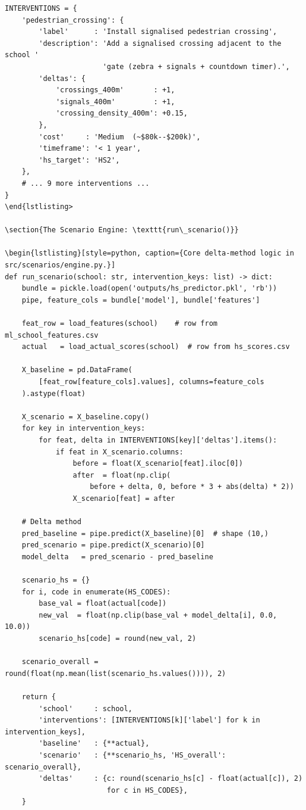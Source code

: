 \documentclass[11pt,a4paper,openany]{book}
\begin{document}
\begin{lstlisting}[style=python, caption={Example intervention definition (pedestrian\_crossing).}]
INTERVENTIONS = {
    'pedestrian_crossing': {
        'label'      : 'Install signalised pedestrian crossing',
        'description': 'Add a signalised crossing adjacent to the school '
                       'gate (zebra + signals + countdown timer).',
        'deltas': {
            'crossings_400m'       : +1,
            'signals_400m'         : +1,
            'crossing_density_400m': +0.15,
        },
        'cost'     : 'Medium  (~$80k--$200k)',
        'timeframe': '< 1 year',
        'hs_target': 'HS2',
    },
    # ... 9 more interventions ...
}
\end{lstlisting>

\section{The Scenario Engine: \texttt{run\_scenario()}}

\begin{lstlisting}[style=python, caption={Core delta-method logic in src/scenarios/engine.py.}]
def run_scenario(school: str, intervention_keys: list) -> dict:
    bundle = pickle.load(open('outputs/hs_predictor.pkl', 'rb'))
    pipe, feature_cols = bundle['model'], bundle['features']

    feat_row = load_features(school)    # row from ml_school_features.csv
    actual   = load_actual_scores(school)  # row from hs_scores.csv

    X_baseline = pd.DataFrame(
        [feat_row[feature_cols].values], columns=feature_cols
    ).astype(float)

    X_scenario = X_baseline.copy()
    for key in intervention_keys:
        for feat, delta in INTERVENTIONS[key]['deltas'].items():
            if feat in X_scenario.columns:
                before = float(X_scenario[feat].iloc[0])
                after  = float(np.clip(
                    before + delta, 0, before * 3 + abs(delta) * 2))
                X_scenario[feat] = after

    # Delta method
    pred_baseline = pipe.predict(X_baseline)[0]  # shape (10,)
    pred_scenario = pipe.predict(X_scenario)[0]
    model_delta   = pred_scenario - pred_baseline

    scenario_hs = {}
    for i, code in enumerate(HS_CODES):
        base_val = float(actual[code])
        new_val  = float(np.clip(base_val + model_delta[i], 0.0, 10.0))
        scenario_hs[code] = round(new_val, 2)

    scenario_overall = round(float(np.mean(list(scenario_hs.values()))), 2)

    return {
        'school'     : school,
        'interventions': [INTERVENTIONS[k]['label'] for k in intervention_keys],
        'baseline'   : {**actual},
        'scenario'   : {**scenario_hs, 'HS_overall': scenario_overall},
        'deltas'     : {c: round(scenario_hs[c] - float(actual[c]), 2)
                        for c in HS_CODES},
    }
\end{lstlisting}
\end{document}
